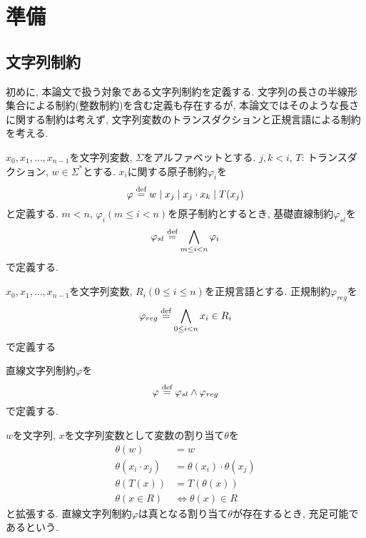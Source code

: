 \documentclass[uplatex,dvipdfmx,a4j]{jsreport}
\begin{document}
  \chapter{準備}  \label{chap:preliminalies}

  \section{文字列制約}

  初めに, 本論文で扱う対象である文字列制約を定義する.
  文字列の長さの半線形集合による制約(整数制約)を含む定義も存在するが,
  本論文ではそのような長さに関する制約は考えず, 文字列変数のトランスダクションと正規言語による制約
  を考える.

  \begin{definition}[基礎直線制約]
    $x_0, x_1, \ldots, x_{n - 1}$を文字列変数, $\Sigma$をアルファベットとする.
    $j, k < i$, $T$: トランスダクション, $w \in \Sigma^*$とする.
    $x_i$に関する原子制約$\varphi_i$を
    \[
      \varphi \overset{\scriptsize \mbox{def}}{=} w \mid x_j \mid x_j \cdot x_k \mid T(x_j)
    \]
    と定義する.
    $m < n$, $\varphi_i (m \leq i < n)$を原子制約とするとき,
    基礎直線制約$\varphi_{sl}$を
    \[
      \varphi_{sl} \overset{\scriptsize \mbox{def}}{=} \bigwedge_{m \leq i < n} \varphi_i
    \]
    で定義する.
  \end{definition}

  \begin{definition}[正規制約]
    $x_0, x_1, \ldots, x_{n - 1}$を文字列変数, $R_i (0 \leq i \le n)$を正規言語とする.
    正規制約$\varphi_{reg}$を
    \[
      \varphi_{reg} \overset{\scriptsize \mbox{def}}{=} \bigwedge_{0 \leq i < n} x_i \in R_i
    \]
    で定義する
  \end{definition}

  \begin{definition}[文字列制約]
    直線文字列制約$\varphi$を
    \[
      \varphi \overset{\scriptsize \mbox{def}}{=} \varphi_{sl} \land \varphi_{reg}
    \]
    で定義する.
  \end{definition}

  $w$を文字列, $x$を文字列変数として変数の割り当て$\theta$を
  \begin{align*}
    \theta(w) &= w \\
    \theta(x_i \cdot x_j) &= \theta(x_i) \cdot \theta(x_j)  \\
    \theta(T(x)) &= T(\theta(x))  \\
    \theta(x \in R) &\Leftrightarrow \theta(x) \in R
  \end{align*}
  と拡張する.
  直線文字列制約$\varphi$は真となる割り当て$\theta$が存在するとき, 充足可能であるという.
\end{document}
